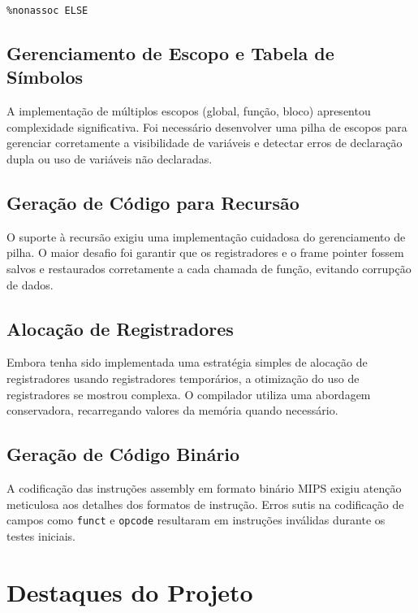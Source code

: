 \documentclass[
	12pt,				%
	oneside,
	a4paper,			%
	english,			%
	french,				%
	spanish,			%
	brazil,				%
	]{abntex2}
\begin{document}
\begin{lstlisting}[style=cstyle]
%nonassoc LOWER_THAN_ELSE
%nonassoc ELSE
\end{lstlisting}

\subsection{Gerenciamento de Escopo e Tabela de Símbolos}

A implementação de múltiplos escopos (global, função, bloco) apresentou complexidade significativa. Foi necessário desenvolver uma pilha de escopos para gerenciar corretamente a visibilidade de variáveis e detectar erros de declaração dupla ou uso de variáveis não declaradas.

\subsection{Geração de Código para Recursão}

O suporte à recursão exigiu uma implementação cuidadosa do gerenciamento de pilha. O maior desafio foi garantir que os registradores e o frame pointer fossem salvos e restaurados corretamente a cada chamada de função, evitando corrupção de dados.

\subsection{Alocação de Registradores}

Embora tenha sido implementada uma estratégia simples de alocação de registradores usando registradores temporários, a otimização do uso de registradores se mostrou complexa. O compilador utiliza uma abordagem conservadora, recarregando valores da memória quando necessário.

\subsection{Geração de Código Binário}

A codificação das instruções assembly em formato binário MIPS exigiu atenção meticulosa aos detalhes dos formatos de instrução. Erros sutis na codificação de campos como \texttt{funct} e \texttt{opcode} resultaram em instruções inválidas durante os testes iniciais.

\section{Destaques do Projeto}
\end{document}
